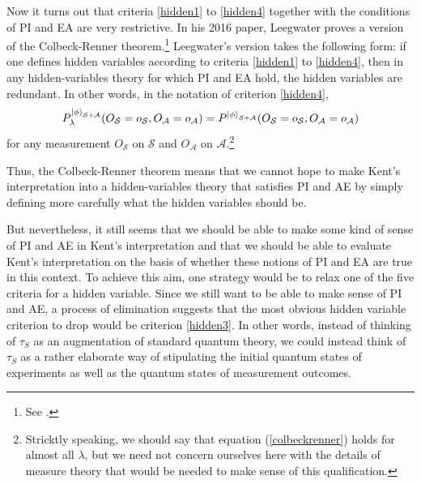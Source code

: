 Now it turns out that criteria \ref{hidden1} to \ref{hidden4} together with the conditions of PI and EA are very restrictive. In his 2016 paper, Leegwater proves a version of the Colbeck-Renner theorem.\footnote{See \cite{LeegwaterGijs2016Aitf}.} Leegwater's version takes the following form: if one defines hidden variables according to criteria \ref{hidden1} to \ref{hidden4}, then in any hidden-variables theory for which PI and EA hold, the hidden variables are redundant. In other words, in the notation of criterion \ref{hidden4},
\begin{equation}\label{colbeckrenner}
P_\lambda^{\ket{\phi}_{\mathcal{S}+\mathcal{A}}}(O_\mathcal{S}=o_\mathcal{S},O_\mathcal{A}=o_\mathcal{A})=P^{\ket{\phi}_{\mathcal{S}+\mathcal{A}}}(O_\mathcal{S}=o_\mathcal{S},O_\mathcal{A}=o_\mathcal{A})
\end{equation}
for any measurement $O_\mathcal{S}$ on $\mathcal{S}$ and $O_\mathcal{A}$ on $\mathcal{A}$.\footnote{Stricktly speaking, we should say that equation (\ref{colbeckrenner}) holds for almost all $\lambda$, but we need not concern ourselves here with the details of measure theory that would be needed to make sense of this qualification.}

Thus, the Colbeck-Renner theorem means that we cannot hope to make Kent's interpretation into a hidden-variables theory that satisfies PI and AE by simply defining more carefully what the hidden variables should be. 

But nevertheless, it still seems that we should be able to make some kind of sense of PI and AE in Kent's interpretation and that we should be able to evaluate Kent's interpretation on the basis of whether these notions of PI and EA are true in this context. To achieve this aim, one strategy would be to relax one of the five criteria for a hidden variable. Since we still want to be able to make sense of PI and AE,  a process of elimination suggests that the most obvious hidden variable criterion to drop would be criterion \ref{hidden3}. In other words, instead of thinking of $\tau_S$ as an augmentation of standard quantum theory, we could instead think of $\tau_S$ as a rather elaborate way of stipulating the initial quantum states of experiments as well as the quantum states of measurement outcomes.


